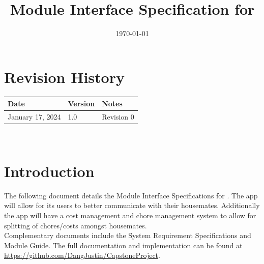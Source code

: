 \documentclass[12pt, titlepage]{article}
\begin{document}
\title{Module Interface Specification for \progname{}}

\author{\authname}

\date{\today}

\maketitle


\section{Revision History}

\begin{tabularx}{\textwidth}{p{3cm}p{2cm}X}
\toprule {\bf Date} & {\bf Version} & {\bf Notes}\\
\midrule
January 17, 2024 & 1.0 & Revision 0\\
\bottomrule
\end{tabularx}

~\newpage





\tableofcontents

\newpage


\section{Introduction}

The following document details the Module Interface Specifications for \progname{}. The \progname{} app will allow for its users to better communicate with their housemates.  Additionally the app will have a cost management and chore management system to allow for splitting of chores/costs amongst housemates. \\

Complementary documents include the System Requirement Specifications
and Module Guide.  The full documentation and implementation can be
found at \url{https://github.com/DangJustin/CapstoneProject}.  
\end{document}
